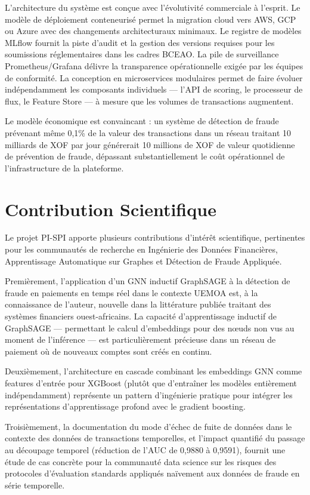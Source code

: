 \documentclass[12pt,a4paper,oneside]{book}
\theoremstyle{definition}
\theoremstyle{plain}
\begin{document}
L'architecture du système est conçue avec l'évolutivité commerciale à l'esprit. Le modèle de déploiement conteneurisé permet la migration cloud vers AWS, GCP ou Azure avec des changements architecturaux minimaux. Le registre de modèles MLflow fournit la piste d'audit et la gestion des versions requises pour les soumissions réglementaires dans les cadres BCEAO. La pile de surveillance Prometheus/Grafana délivre la transparence opérationnelle exigée par les équipes de conformité. La conception en microservices modulaires permet de faire évoluer indépendamment les composants individuels — l'API de scoring, le processeur de flux, le Feature Store — à mesure que les volumes de transactions augmentent.

Le modèle économique est convaincant : un système de détection de fraude prévenant même 0,1\% de la valeur des transactions dans un réseau traitant 10 milliards de XOF par jour générerait 10 millions de XOF de valeur quotidienne de prévention de fraude, dépassant substantiellement le coût opérationnel de l'infrastructure de la plateforme.

\section{Contribution Scientifique}

Le projet PI-SPI apporte plusieurs contributions d'intérêt scientifique, pertinentes pour les communautés de recherche en Ingénierie des Données Financières, Apprentissage Automatique sur Graphes et Détection de Fraude Appliquée.

Premièrement, l'application d'un GNN inductif GraphSAGE à la détection de fraude en paiements en temps réel dans le contexte UEMOA est, à la connaissance de l'auteur, nouvelle dans la littérature publiée traitant des systèmes financiers ouest-africains. La capacité d'apprentissage inductif de GraphSAGE — permettant le calcul d'embeddings pour des nœuds non vus au moment de l'inférence — est particulièrement précieuse dans un réseau de paiement où de nouveaux comptes sont créés en continu.

Deuxièmement, l'architecture en cascade combinant les embeddings GNN comme features d'entrée pour XGBoost (plutôt que d'entraîner les modèles entièrement indépendamment) représente un pattern d'ingénierie pratique pour intégrer les représentations d'apprentissage profond avec le gradient boosting.

Troisièmement, la documentation du mode d'échec de fuite de données dans le contexte des données de transactions temporelles, et l'impact quantifié du passage au découpage temporel (réduction de l'AUC de 0,9880 à 0,9591), fournit une étude de cas concrète pour la communauté data science sur les risques des protocoles d'évaluation standards appliqués naïvement aux données de fraude en série temporelle.
\end{document}
